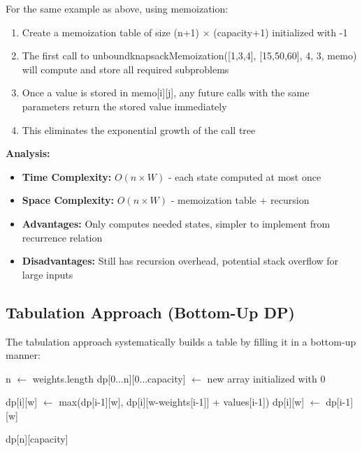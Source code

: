 \documentclass{article}
\begin{document}
\begin{tcolorbox}[examplebox, title=Memoization Example]
For the same example as above, using memoization:

\begin{enumerate}
    \item Create a memoization table of size (n+1) × (capacity+1) initialized with -1
    \item The first call to unboundknapsackMemoization([1,3,4], [15,50,60], 4, 3, memo) will compute and store all required subproblems
    \item Once a value is stored in memo[i][j], any future calls with the same parameters return the stored value immediately
    \item This eliminates the exponential growth of the call tree
\end{enumerate}
\end{tcolorbox}

\textbf{Analysis:}
\begin{itemize}[leftmargin=*]
    \item \textbf{Time Complexity:} $O(n \times W)$ - each state computed at most once
    \item \textbf{Space Complexity:} $O(n \times W)$ - memoization table + recursion
    \item \textbf{Advantages:} Only computes needed states, simpler to implement from recurrence relation
    \item \textbf{Disadvantages:} Still has recursion overhead, potential stack overflow for large inputs
\end{itemize}

\subsection{Tabulation Approach (Bottom-Up DP)}

The tabulation approach systematically builds a table by filling it in a bottom-up manner:

\begin{tcolorbox}[title=Algorithm: Tabulation Approach]
\begin{algorithm}[H]
\begin{algorithmic}[1]
    \State n $\gets$ weights.length
    \State dp[0...n][0...capacity] $\gets$ new array initialized with 0
    
                \State dp[i][w] $\gets$ max(dp[i-1][w], dp[i][w-weights[i-1]] + values[i-1])
            \Else
                \State dp[i][w] $\gets$ dp[i-1][w]
            \EndIf
        \EndFor
    \EndFor
    
    \Return dp[n][capacity]
\EndFunction
\end{algorithmic}
\end{algorithm}
\end{tcolorbox}
\end{document}

